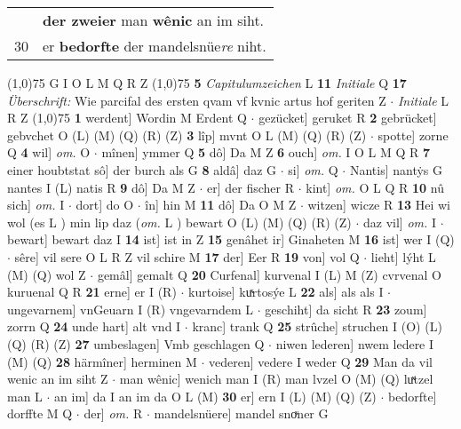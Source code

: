 \documentclass[8pt,a4paper,notitlepage]{article}
\begin{document}
\begin{table}[ht]
\begin{minipage}[t]{0.5\linewidth}
\begin{tabular}{rl}
 & \textbf{der zweier} man \textbf{wênic} an im siht.\\ 
30 & er \textbf{bedorfte} der mandelsnüe\textit{re} niht.\\ 
\end{tabular}
\scriptsize
\line(1,0){75} \newline
G I O L M Q R Z \newline
\line(1,0){75} \newline
\textbf{5} \textit{Capitulumzeichen} L  \textbf{11} \textit{Initiale} Q  \textbf{17} \textit{Überschrift:} Wie parcifal des ersten qvam vf kvnic artus hof geriten Z   $\cdot$ \textit{Initiale} L R Z  \newline
\line(1,0){75} \newline
\textbf{1} werdent] Wordin M Erdent Q  $\cdot$ gezücket] geruket R \textbf{2} gebrücket] gebvchet O (L) (M) (Q) (R) (Z) \textbf{3} lîp] mvnt O L (M) (Q) (R) (Z)  $\cdot$ spotte] zorne Q \textbf{4} wil] \textit{om.} O  $\cdot$ mînen] ymmer Q \textbf{5} dô] Da M Z \textbf{6} ouch] \textit{om.} I O L M Q R \textbf{7} einer houbtstat sô] der burch als G \textbf{8} aldâ] daz G  $\cdot$ si] \textit{om.} Q  $\cdot$ Nantis] nantẏs G nantes I (L) natis R \textbf{9} dô] Da M Z  $\cdot$ er] der fischer R  $\cdot$ kint] \textit{om.} O L Q R \textbf{10} nû sich] \textit{om.} I  $\cdot$ dort] do O  $\cdot$ în] hin M \textbf{11} dô] Da O M Z  $\cdot$ witzen] wicze R \textbf{13} Hei wi wol (es L ) min lip daz (\textit{om.} L ) bewart O (L) (M) (Q) (R) (Z)  $\cdot$ daz vil] \textit{om.} I  $\cdot$ bewart] bewart daz I \textbf{14} ist] ist in Z \textbf{15} genâhet ir] Ginaheten M \textbf{16} ist] wer I (Q)  $\cdot$ sêre] vil sere O L R Z vil schire M \textbf{17} der] Eer R \textbf{19} von] vol Q  $\cdot$ lieht] lýht L (M) (Q) wol Z  $\cdot$ gemâl] gemalt Q \textbf{20} Curfenal] kurvenal I (L) M (Z) cvrvenal O kuruenal Q R \textbf{21} erne] er I (R)  $\cdot$ kurtoise] kuͯrtosýe L \textbf{22} als] als als I  $\cdot$ ungevarnem] vnGeuarn I (R) vngevarndem L  $\cdot$ geschiht] da sicht R \textbf{23} zoum] zorrn Q \textbf{24} unde hart] alt vnd I  $\cdot$ kranc] trank Q \textbf{25} strûche] struchen I (O) (L) (Q) (R) (Z) \textbf{27} umbeslagen] Vmb geschlagen Q  $\cdot$ niwen lederen] nwem ledere I (M) (Q) \textbf{28} härmîner] herminen M  $\cdot$ vederen] vedere I weder Q \textbf{29} Man da vil wenic an im siht Z  $\cdot$ man wênic] wenich man I (R) man lvzel O (M) (Q) luͯtzel man L  $\cdot$ an im] da I an im da O L (M) \textbf{30} er] ern I (L) (M) (Q) (Z)  $\cdot$ bedorfte] dorffte M Q  $\cdot$ der] \textit{om.} R  $\cdot$ mandelsnüere] mandel snoͮner G \newline

\end{minipage}
\end{table}
\end{document}
